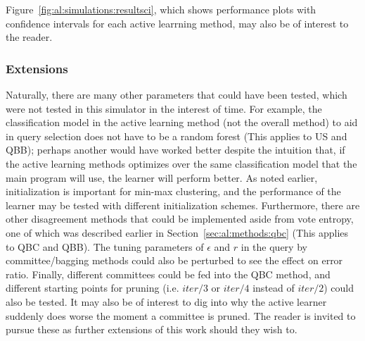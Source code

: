 Figure~\ref{fig:al:simulations:resultsci}, which shows performance plots with 
confidence intervals for each active learrning method, may also be of interest 
to the reader.


\subsubsection{Extensions}

Naturally, there are many other parameters that could have been tested, which 
were not tested in this simulator in the interest of time. For 
example, the classification model in the active learning method (not the 
overall method) to aid in query selection does not have to be a random forest 
(This applies to US and QBB); perhaps another would have worked better despite 
the intuition that, if the active learning methods optimizes over the same 
classification model that the main program will use, the learner will perform 
better. As noted earlier, initialization is important for min-max clustering, 
and the performance of the learner may be tested with different initialization 
schemes. Furthermore, there are other disagreement methods 
that could be implemented aside from vote entropy, one of which was described 
earlier in Section~\ref{sec:al:methods:qbc} (This applies to QBC and QBB). The 
tuning parameters of $\epsilon$ and $r$ in the query by committee/bagging 
methods could also be perturbed to see the effect on error ratio. Finally, 
different committees could be fed into the QBC method, and different starting 
points for pruning (i.e. $iter/3$ or $iter/4$ instead of $iter/2$) could also 
be tested. It may also be of interest to dig into why the active learner 
suddenly does worse the moment a committee is pruned. The reader is invited to 
pursue these as further extensions of this work should they wish to.